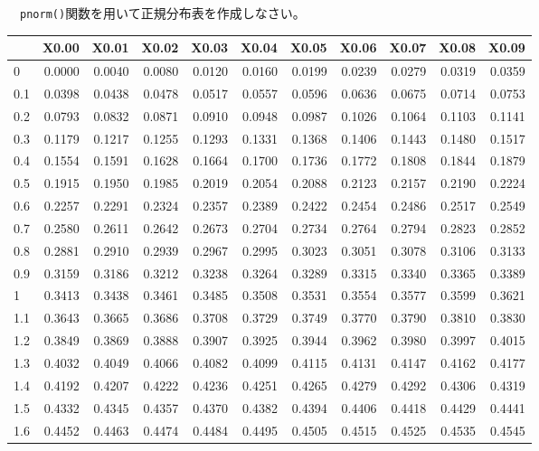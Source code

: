 \documentclass[]{tufte-handout}
\begin{document}
　\texttt{pnorm()}関数を用いて正規分布表を作成しなさい。

\begin{longtable}[]{@{}lrrrrrrrrrr@{}}
\toprule
& X0.00 & X0.01 & X0.02 & X0.03 & X0.04 & X0.05 & X0.06 & X0.07 & X0.08
& X0.09 \\
\midrule
\endhead
0 & 0.0000 & 0.0040 & 0.0080 & 0.0120 & 0.0160 & 0.0199 & 0.0239 &
0.0279 & 0.0319 & 0.0359 \\
0.1 & 0.0398 & 0.0438 & 0.0478 & 0.0517 & 0.0557 & 0.0596 & 0.0636 &
0.0675 & 0.0714 & 0.0753 \\
0.2 & 0.0793 & 0.0832 & 0.0871 & 0.0910 & 0.0948 & 0.0987 & 0.1026 &
0.1064 & 0.1103 & 0.1141 \\
0.3 & 0.1179 & 0.1217 & 0.1255 & 0.1293 & 0.1331 & 0.1368 & 0.1406 &
0.1443 & 0.1480 & 0.1517 \\
0.4 & 0.1554 & 0.1591 & 0.1628 & 0.1664 & 0.1700 & 0.1736 & 0.1772 &
0.1808 & 0.1844 & 0.1879 \\
0.5 & 0.1915 & 0.1950 & 0.1985 & 0.2019 & 0.2054 & 0.2088 & 0.2123 &
0.2157 & 0.2190 & 0.2224 \\
0.6 & 0.2257 & 0.2291 & 0.2324 & 0.2357 & 0.2389 & 0.2422 & 0.2454 &
0.2486 & 0.2517 & 0.2549 \\
0.7 & 0.2580 & 0.2611 & 0.2642 & 0.2673 & 0.2704 & 0.2734 & 0.2764 &
0.2794 & 0.2823 & 0.2852 \\
0.8 & 0.2881 & 0.2910 & 0.2939 & 0.2967 & 0.2995 & 0.3023 & 0.3051 &
0.3078 & 0.3106 & 0.3133 \\
0.9 & 0.3159 & 0.3186 & 0.3212 & 0.3238 & 0.3264 & 0.3289 & 0.3315 &
0.3340 & 0.3365 & 0.3389 \\
1 & 0.3413 & 0.3438 & 0.3461 & 0.3485 & 0.3508 & 0.3531 & 0.3554 &
0.3577 & 0.3599 & 0.3621 \\
1.1 & 0.3643 & 0.3665 & 0.3686 & 0.3708 & 0.3729 & 0.3749 & 0.3770 &
0.3790 & 0.3810 & 0.3830 \\
1.2 & 0.3849 & 0.3869 & 0.3888 & 0.3907 & 0.3925 & 0.3944 & 0.3962 &
0.3980 & 0.3997 & 0.4015 \\
1.3 & 0.4032 & 0.4049 & 0.4066 & 0.4082 & 0.4099 & 0.4115 & 0.4131 &
0.4147 & 0.4162 & 0.4177 \\
1.4 & 0.4192 & 0.4207 & 0.4222 & 0.4236 & 0.4251 & 0.4265 & 0.4279 &
0.4292 & 0.4306 & 0.4319 \\
1.5 & 0.4332 & 0.4345 & 0.4357 & 0.4370 & 0.4382 & 0.4394 & 0.4406 &
0.4418 & 0.4429 & 0.4441 \\
1.6 & 0.4452 & 0.4463 & 0.4474 & 0.4484 & 0.4495 & 0.4505 & 0.4515 &
0.4525 & 0.4535 & 0.4545 \\

\end{longtable}
\end{document}
